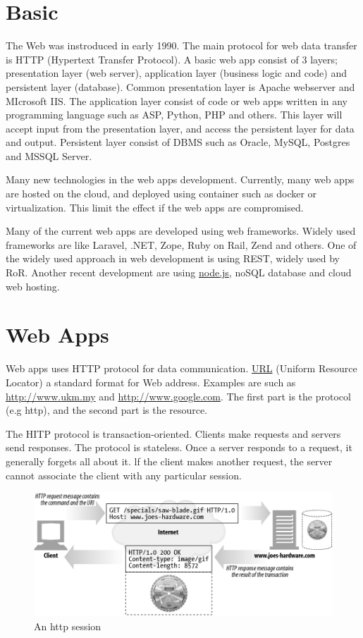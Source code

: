 \documentclass[7x9]{times}
\begin{document}
\section{Basic}

The Web was instroduced in early 1990. The main protocol for web data
transfer is HTTP (Hypertext Transfer Protocol). A basic web app consist of
3 layers; presentation layer (web server), application layer (business logic
and code) and persistent layer (database). Common presentation layer is
Apache webserver and MIcrosoft IIS. The application layer consist of code 
or web apps written in any programming language such as ASP, Python, PHP and
others. This layer will accept input from the presentation layer, and access the
persistent layer for data and output. Persistent layer consist of DBMS such as
Oracle, MySQL, Postgres and MSSQL Server.

Many new technologies in the web apps development. Currently, many web apps are hosted
on the cloud, and deployed using container such as docker or virtualization. This limit
the effect if the web apps are compromised.

Many of the current web apps are developed using web frameworks. Widely used frameworks
are like Laravel, .NET, Zope, Ruby on Rail, Zend and others. One of the widely used 
approach in web development is using REST, widely used by RoR. Another recent
development are using \url{node.js}, noSQL database and cloud web hosting.

\section{Web Apps}

Web apps uses HTTP protocol\cite{gourley2002http} for data communication. \url{URL} (Uniform 
Resource Locator) a standard format for
Web address. Examples are such as \url{http://www.ukm.my} and \url{http://www.google.com}.
The first part is the protocol (e.g http), and the second part is the resource.

The HITP protocol is transaction-oriented. Clients make requests and servers send responses. 
The protocol is stateless. Once a server responds to a request, it generally forgets all about it. 
lf the client makes another request, the server cannot associate the client with any particular
session.

\begin{figure}[ht]
\includegraphics[width=.75\textwidth]{http.png}
\caption{An http session}
\label{fig:http}
\end{figure}
\end{document}
